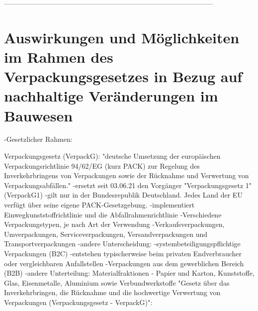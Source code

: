 ------------------------------------------------------------------------------------------

\section{Auswirkungen und Möglichkeiten im Rahmen des Verpackungsgesetzes in Bezug auf nachhaltige Veränderungen im Bauwesen}
\label{sec:Definitionen:Auswirkungen und Möglichkeiten des Verpackungsgesetzes in Bezug auf potentielle Änderungen im Bauwesen}

-Gesetzlicher Rahmen:

Verpackungsgesetz (VerpackG):
    "deutsche Umsetzung der europäischen Verpackungsrichtlinie 94/62/EG (kurz PACK) zur Regelung des Inverkehrbringens von Verpackungen sowie der Rücknahme und Verwertung von Verpackungsabfällen."
    -ersetzt seit 03.06.21 den Vorgänger "Verpackungsgesetz 1"(VerpackG1)
      -gilt nur in der Bundesrepublik Deutschland. Jedes Land der EU verfügt über seine eigene PACK-Gesetzgebung.
    -implementiert Einwegkunststoffrichtlinie und die Abfallrahmenrichtlinie
    -Verschiedene Verpackungstypen, je nach Art der Verwendung
        -Verkaufsverpackungen, Umverpackungen, Serviceverpackungen, Versandverpackungen und Transportverpackungen
        -andere Unterscheidung: -systembeteiligungspflichtige Verpackungen (B2C)
                                    -entstehen typischerweise beim privaten Endverbraucher oder vergleichbaren Anfallstellen
                                -Verpackungen aus dem gewerblichen Bereich (B2B)
        -andere Unterteilung: Materialfraktionen
                                - Papier und Karton, Kunststoffe, Glas, Eisenmetalle, Aluminium sowie Verbundwerkstoffe
"Gesetz über das Inverkehrbringen, die Rücknahme und die
hochwertige Verwertung von Verpackungen (Verpackungsgesetz -
VerpackG)":

